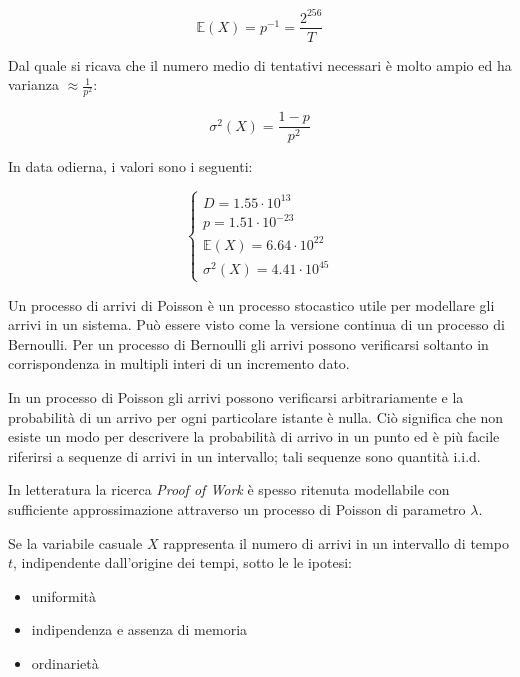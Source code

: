 \documentclass{book}
\theoremstyle{definition}
\begin{document}
\begin{equation}
    \mathbb{E}(X) = p^{-1} = \frac{2^{256}}{T} \label{valore atteso}
\end{equation}

Dal quale si ricava che il numero medio di tentativi necessari è molto ampio ed ha varianza $\approx \frac{1}{p^{2}}$:

\begin{equation}
    \sigma^{2}(X) = \frac{1 - p}{p^2} \label{varianza}
\end{equation}

In data odierna, i valori sono i seguenti:

\begin{equation}
    \left \{
        \begin{array}{ll}
            D = 1.55 \cdot 10^{13} \\
            p = 1.51 \cdot 10^{-23} \\
            \mathbb{E}(X) = 6.64 \cdot 10^{22}\\
            \sigma^{2}(X) = 4.41 \cdot 10^{45}
        \end{array}
    \right .
\end{equation}

Un processo di arrivi di Poisson è un processo stocastico utile per modellare gli arrivi in un sistema. Può essere visto come la versione continua di un processo di Bernoulli. Per un processo di Bernoulli gli arrivi possono verificarsi soltanto in corrispondenza in multipli interi di un incremento dato.

In un processo di Poisson gli arrivi possono verificarsi arbitrariamente e la probabilità di un arrivo per ogni particolare istante è nulla. 
Ciò significa che non esiste un modo per descrivere la probabilità di arrivo in un punto ed è più facile riferirsi a sequenze di arrivi in un intervallo; tali sequenze sono quantità i.i.d.

In letteratura la ricerca \textit{Proof of Work} è spesso ritenuta modellabile con sufficiente approssimazione attraverso un processo di Poisson di parametro $\lambda$.

Se la variabile casuale $X$ rappresenta il numero di arrivi in un intervallo di tempo $t$, indipendente dall'origine dei tempi, sotto le le ipotesi:

\begin{itemize}
    \item uniformità
    \item indipendenza e assenza di memoria
    \item ordinarietà
\end{itemize}
\end{document}
